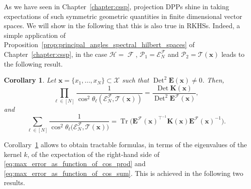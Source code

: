 \documentclass[twoside,11pt]{book}
\newtheorem{corollary}{Corollary}
\numberwithin{theorem}{chapter}
\numberwithin{definition}{chapter}
\numberwithin{proposition}{chapter}
\numberwithin{corollary}{chapter}
\numberwithin{example}{chapter}
\numberwithin{lemma}{chapter}
\DeclareMathOperator{\Tr}{Tr}
\DeclareMathOperator{\Det}{Det}
\DeclareMathOperator{\Tran}{\intercal}
\DeclareMathOperator*{\KDPP}{\mathfrak{K}}
\DeclareMathOperator{\F}{\mathcal{F}}
\begin{document}
As we have seen in Chapter~\ref{chapter:cssp}, projection DPPs shine in taking expectations of such symmetric geometric quantities in finite dimensional vector spaces. We will show in the following that this is also true in RKHSs. Indeed, a simple application of Proposition~\ref{prop:principal_angles_spectral_hilbert_spaces} of Chapter~\ref{chapter:cssp}, in the case $\mathcal{H} = \F$, $\mathcal{P}_{1} = \mathcal{E}_{N}^{\F}$ and $\mathcal{P}_{2} = \mathcal{T}(\bm{x})$ leads to the following result.



\begin{corollary}\label{cor:cos_ratio_det}
Let $\bm{x} =  \{ x_{1}, \dots , x_{N}\} \subset \mathcal{X}$ such that $\Det^{2} \bm{E}(\bm{x}) \neq 0$. Then,
\begin{equation}
\prod\limits_{\ell \in [N]} \frac{1}{\cos^{2} \theta_{\ell} \left(\mathcal{E}^{\mathcal{F}}_{N}, \mathcal{T}(\bm{x}) \right)} = \frac{\Det \bm{K}(\bm{x})}{\Det^{2} \bm{E}^{\mathcal{F}}(\bm{x})},
\end{equation}
and
\begin{equation}
\sum\limits_{\ell \in [N]} \frac{1}{\cos^{2} \theta_{\ell} \bigg(\mathcal{E}^{\mathcal{F}}_{N}, \mathcal{T}(\bm{x}) \bigg)} = \Tr \bigg(\bm{E}^{\mathcal{F}}(\bm{x})^{\Tran^{-1}}  \bm{K}(\bm{x}) \bm{E}^{\mathcal{F}}(\bm{x})^{-1} \bigg).
\end{equation}
\end{corollary}





Corollary~\ref{cor:cos_ratio_det} allows to obtain tractable formulas, in terms of the eigenvalues of the kernel $k$, of the expectation of the right-hand side of \eqref{eq:max_error_as_function_of_cos_prod} and \eqref{eq:max_error_as_function_of_cos_sum}.
This is achieved in the following two results.

\end{document}
